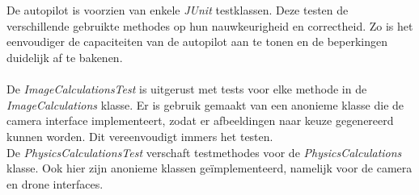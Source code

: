 \\
\\
De autopilot is voorzien van enkele \textit{JUnit} testklassen. Deze testen de verschillende gebruikte methodes op hun nauwkeurigheid en correctheid. Zo is het eenvoudiger de capaciteiten van de autopilot aan te tonen en de beperkingen duidelijk af te bakenen.
\\
\\
De \textit{ImageCalculationsTest} is uitgerust met tests voor elke methode in de \textit{ImageCalculations} klasse. Er is gebruik gemaakt van een anonieme klasse die de camera interface implementeert, zodat er afbeeldingen naar keuze gegenereerd kunnen worden. Dit vereenvoudigt immers het testen.
\\
De \textit{PhysicsCalculationsTest} verschaft testmethodes voor de \textit{PhysicsCalculations} klasse. Ook hier zijn anonieme klassen ge\"implementeerd, namelijk voor de camera en drone interfaces.

